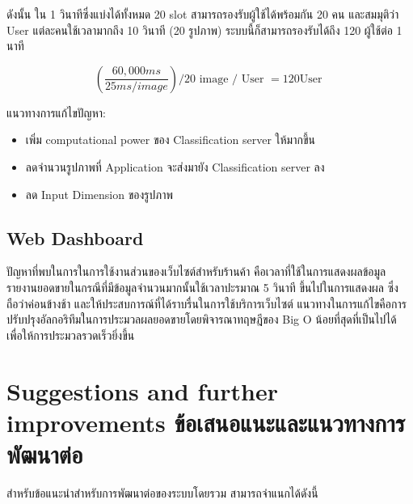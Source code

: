ดังนั้น ใน 1 วินาทีซึ่งแบ่งได้ทั้งหมด 20  slot สามารถรองรับผู้ใช้ได้พร้อมกัน 20 คน
และสมมุติว่า User แต่ละคนใช้เวลามากถึง 10 วินาที (20 รูปภาพ) ระบบนี้ก็สามารถรองรับได้ถึง 120 ผู้ใช้ต่อ 1 นาที

\begin{equation}
    ({\frac {60,000 ms}{25 ms / image}} )   / 20 \text{ image / User }  = 120 \text{User }
\end{equation}

แนวทางการแก้ไขปัญหา:

\begin{itemize}
    \item เพิ่ม computational power ของ Classification server ให้มากขึ้น
    \item ลดจำนวนรูปภาพที่ Application จะส่งมายัง Classification server ลง
    \item ลด Input Dimension ของรูปภาพ
\end{itemize}

\subsection{Web Dashboard}
ปัญหาที่พบในการในการใช้งานส่วนของเว็บไซต์สำหรับร้านค้า คือเวลาที่ใช้ในการแสดงผลข้อมูลรายงานยอดขายในกรณีที่มีข้อมูลจำนวนมากนั้นใช้เวลาปะรมาณ 5 วินาที
ขึ้นไปในการแสดงผล ซึ่งถือว่าค่อนข้างช้า และให้ประสบการณ์ที่ได้ราบรื่นในการใช้บริการเว็บไซต์ แนวทางในการแก้ไขคือการปรับปรุงอัลกอริทึมในการประมวลผลยอดขายโดยพิจารณาทฤษฎีของ
Big O น้อยที่สุดที่เป็นไปได้ เพื่อให้การประมวลรวดเร็วยิ่งขึ้น



\section{\ifenglish%
      Suggestions and further improvements
  \else%
      ข้อเสนอแนะและแนวทางการพัฒนาต่อ
  \fi
 }
 สำหรับข้อแนะนำสำหรับการพัฒนาต่อของระบบโดยรวม สามารถจำแนกได้ดังนี้

